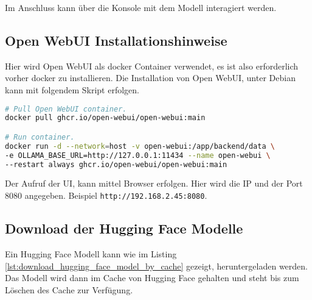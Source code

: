 Im Anschluss kann über die Konsole mit dem Modell interagiert werden.

\newpage

\subsection{Open WebUI Installationshinweise}\label{sec:open_webui}
Hier wird Open WebUI als docker Container verwendet, es ist also erforderlich vorher docker zu installieren. Die Installation von Open WebUI, unter Debian kann mit folgendem Skript erfolgen. 

\begin{lstlisting}[language=bash,caption={Open WebUI installieren}]
# Pull Open WebUI container.
docker pull ghcr.io/open-webui/open-webui:main

# Run container.
docker run -d --network=host -v open-webui:/app/backend/data \
-e OLLAMA_BASE_URL=http://127.0.0.1:11434 --name open-webui \
--restart always ghcr.io/open-webui/open-webui:main
\end{lstlisting}

Der Aufruf der UI, kann mittel Browser erfolgen. Hier wird die IP und der Port 8080 angegeben. Beispiel \texttt{http://192.168.2.45:8080}.

\newpage

\subsection{Download der Hugging Face Modelle}\label{sec:hugging_face_models}
Ein Hugging Face Modell kann wie im Listing \ref{lst:download_hugging_face_model_by_cache} gezeigt, heruntergeladen werden. Das Modell wird dann im Cache von Hugging Face gehalten und steht bis zum Löschen des Cache zur Verfügung.

